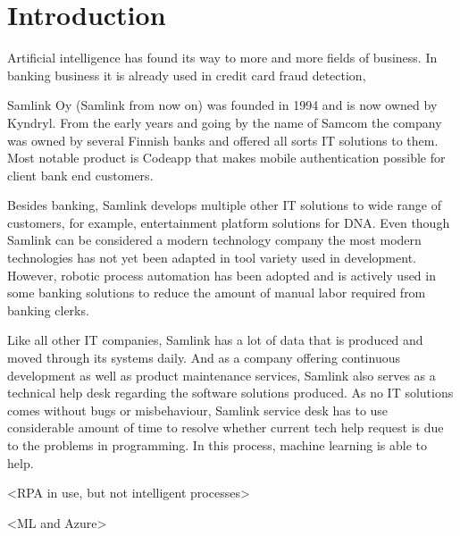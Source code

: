 \documentclass[english, 12pt, a4paper, elec, utf8, a-1b, online]{aaltothesis}
\begin{document}

\section{Introduction}\label{sec:introduction}

\thispagestyle{empty}
Artificial intelligence has found its way to
more and more fields of business.
In banking business it is already used in
credit card fraud detection, %


Samlink Oy (Samlink from now on)
was founded in 1994
and is now owned by Kyndryl.
From the early years
and going by the name of Samcom
the company was owned by several Finnish banks
and offered all sorts IT solutions to them.
Most notable product is Codeapp
that makes mobile authentication possible
for client bank end customers.

Besides banking,
Samlink develops multiple other IT solutions
to wide range of customers,
for example,
entertainment platform solutions for DNA.
Even though Samlink can be considered
a modern technology company
the most modern technologies has not yet been adapted
in tool variety used in development.
However,
robotic process automation has been adopted
and is actively used in some
banking solutions to reduce
the amount of manual labor required
from banking clerks.

Like all other IT companies,
Samlink has a lot of data that is produced
and moved through its systems daily.
And as a company offering continuous development
as well as product maintenance services,
Samlink also serves as a technical help desk
regarding the software solutions produced.
As no IT solutions comes without bugs or misbehaviour,
Samlink service desk has to use considerable amount of time
to resolve whether current tech help request
is due to the problems in programming.
In this process, machine learning is able to help.

<RPA in use, but not intelligent processes>

<ML and Azure>
\end{document}
